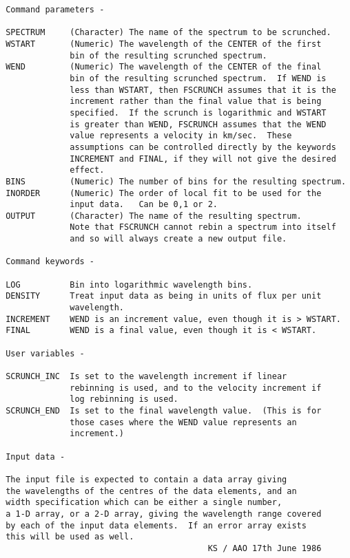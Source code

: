 \begin{description}
\begin{verbatim}
 Command parameters -

 SPECTRUM     (Character) The name of the spectrum to be scrunched.
 WSTART       (Numeric) The wavelength of the CENTER of the first
              bin of the resulting scrunched spectrum.
 WEND         (Numeric) The wavelength of the CENTER of the final
              bin of the resulting scrunched spectrum.  If WEND is
              less than WSTART, then FSCRUNCH assumes that it is the
              increment rather than the final value that is being
              specified.  If the scrunch is logarithmic and WSTART
              is greater than WEND, FSCRUNCH assumes that the WEND
              value represents a velocity in km/sec.  These
              assumptions can be controlled directly by the keywords
              INCREMENT and FINAL, if they will not give the desired
              effect.
 BINS         (Numeric) The number of bins for the resulting spectrum.
 INORDER      (Numeric) The order of local fit to be used for the
              input data.   Can be 0,1 or 2.
 OUTPUT       (Character) The name of the resulting spectrum.
              Note that FSCRUNCH cannot rebin a spectrum into itself
              and so will always create a new output file.

 Command keywords -

 LOG          Bin into logarithmic wavelength bins.
 DENSITY      Treat input data as being in units of flux per unit
              wavelength.
 INCREMENT    WEND is an increment value, even though it is > WSTART.
 FINAL        WEND is a final value, even though it is < WSTART.

 User variables -

 SCRUNCH_INC  Is set to the wavelength increment if linear
              rebinning is used, and to the velocity increment if
              log rebinning is used.
 SCRUNCH_END  Is set to the final wavelength value.  (This is for
              those cases where the WEND value represents an
              increment.)

 Input data -

 The input file is expected to contain a data array giving
 the wavelengths of the centres of the data elements, and an
 width specification which can be either a single number,
 a 1-D array, or a 2-D array, giving the wavelength range covered
 by each of the input data elements.  If an error array exists
 this will be used as well.
                                          KS / AAO 17th June 1986
\end{verbatim}
\end{description}
